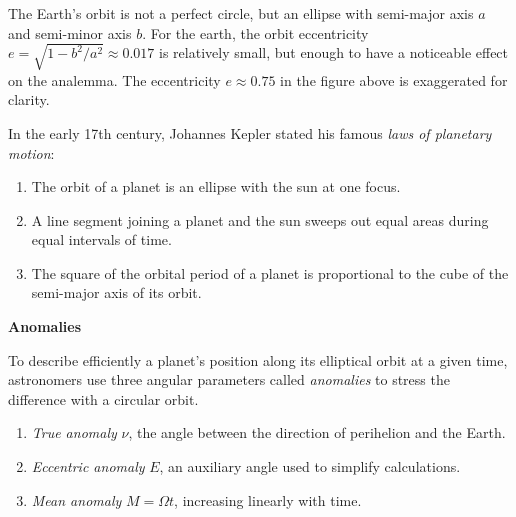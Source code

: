 \documentclass[12pt]{article}
\begin{document}
\begin{figure}
\end{figure}

The Earth's orbit is not a perfect circle, but an ellipse with semi-major axis
$a$ and semi-minor axis $b$. For the earth, the orbit eccentricity 
$e=\sqrt{1-b^2/a^2}\approx 0.017$ is relatively small, but enough to have a
noticeable effect on the analemma. The eccentricity $e\approx 0.75$ in the 
figure above is exaggerated for clarity.

In the early 17th century, Johannes Kepler stated his famous \textit{laws of
planetary motion}:
\begin{enumerate}
    \item The orbit of a planet is an ellipse with the sun at one focus.
    \item A line segment joining a planet and the sun sweeps out equal areas during
        equal intervals of time.
    \item The square of the orbital period of a planet is proportional to the cube
        of the semi-major axis of its orbit.
\end{enumerate}

\textbf{Anomalies}

To describe efficiently a planet's position along its elliptical orbit at a 
given time, astronomers use three angular parameters called \textit{anomalies} to 
stress the difference with a circular orbit. 

\begin{enumerate}
    \item \textit{True anomaly} $\nu$, the angle between the direction of 
    perihelion and the Earth.
    \item \textit{Eccentric anomaly} $E$, an  auxiliary  angle  used to simplify
    calculations.
    \item \textit{Mean anomaly} $M=\Omega t$, increasing linearly with time.
\end{enumerate}
\end{document}
